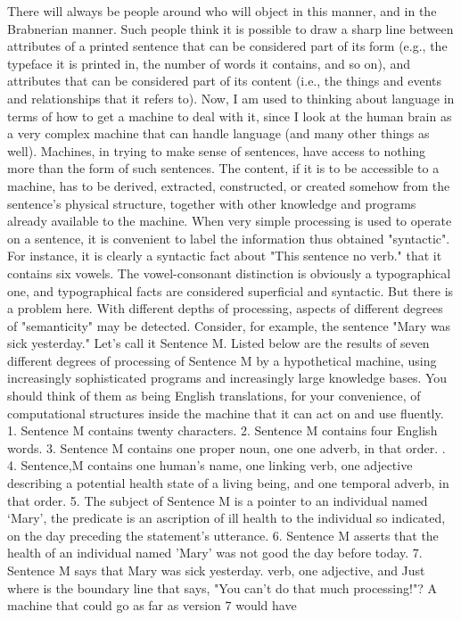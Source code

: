 There will always be people around who will object in this manner, and in the Brabnerian manner. Such people think it is possible to draw a sharp line between attributes of a printed sentence that can be considered part of its form (e.g., the typeface it is printed in, the number of words it contains, and so on), and attributes that can be considered part of its content (i.e., the things and events and relationships that it refers to). Now, I am used to thinking about language in terms of how to get a machine to deal with it, since I look at the human brain as a very complex machine that can handle language (and many other things as well). Machines, in trying to make sense of sentences, have access to nothing more than the form of such sentences. The content, if it is to be accessible to a machine, has to be derived, extracted, constructed, or created somehow from the sentence's physical structure, together with other knowledge and programs already available to the machine. When very simple processing is used to operate on a sentence, it is convenient to label the information thus obtained "syntactic". For instance, it is clearly a syntactic fact about "This sentence no verb." that it contains six vowels. The vowel-consonant distinction is obviously a typographical one, and typographical facts are considered superficial and syntactic. But there is a problem here. With different depths of processing, aspects of different degrees of "semanticity" may be detected. Consider, for example, the sentence "Mary was sick yesterday." Let's call it Sentence M. Listed below are the results of seven different degrees of processing of Sentence M by a hypothetical machine, using increasingly sophisticated programs and increasingly large knowledge bases. You should think of them as being English translations, for your convenience, of computational structures inside the machine that it can act on and use fluently. 
1. Sentence M contains twenty characters. 2. Sentence M contains four English words. 3. Sentence M contains one proper noun, one one adverb, in that order. . 4. Sentence,M contains one human's name, one linking verb, one adjective describing a potential health state of a living being, and one temporal adverb, in that order. 5. The subject of Sentence M is a pointer to an individual named `Mary', the predicate is an ascription of ill health to the individual so indicated, on the day preceding the statement's utterance. 6. Sentence M asserts that the health of an individual named 'Mary' was not good the day before today. 7. Sentence M says that Mary was sick yesterday. verb, one adjective, and 
Just where is the boundary line that says, "You can't do that much processing!"? A machine that could go as far as version 7 would have 




